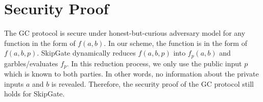 \section{Security Proof} The GC protocol is secure under honest-but-curious adversary model for any function in the form of $f(a,b)$.
In our scheme, the function is in the form of $f(a,b,p)$.
SkipGate dynamically reduces $f(a,b,p)$ into $f_p(a,b)$ and garbles/evaluates $f_p$.
In this reduction process, we only use the public input $p$ which is known to both parties.
In other words, no information about the private inputs $a$ and $b$ is revealed.
Therefore, the security proof of the GC protocol still holds for SkipGate.

